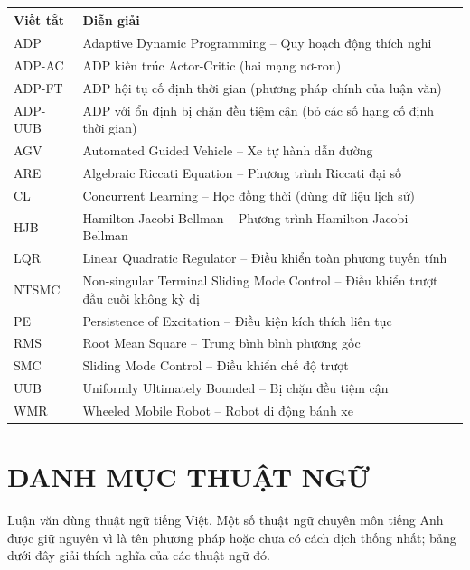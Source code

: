 \documentclass[12pt,a4paper]{article}
\begin{document}
\begin{table}[H]
\centering
\begin{tabular}{lp{10.5cm}}
\toprule
\textbf{Viết tắt} & \textbf{Diễn giải} \\
\midrule
ADP     & Adaptive Dynamic Programming -- Quy hoạch động thích nghi \\
ADP-AC  & ADP kiến trúc Actor-Critic (hai mạng nơ-ron) \\
ADP-FT  & ADP hội tụ cố định thời gian (phương pháp chính của luận văn) \\
ADP-UUB & ADP với ổn định bị chặn đều tiệm cận (bỏ các số hạng cố định thời gian) \\
AGV     & Automated Guided Vehicle -- Xe tự hành dẫn đường \\
ARE     & Algebraic Riccati Equation -- Phương trình Riccati đại số \\
CL      & Concurrent Learning -- Học đồng thời (dùng dữ liệu lịch sử) \\
HJB     & Hamilton-Jacobi-Bellman -- Phương trình Hamilton-Jacobi-Bellman \\
LQR     & Linear Quadratic Regulator -- Điều khiển toàn phương tuyến tính \\
NTSMC   & Non-singular Terminal Sliding Mode Control -- Điều khiển trượt đầu cuối không kỳ dị \\
PE      & Persistence of Excitation -- Điều kiện kích thích liên tục \\
RMS     & Root Mean Square -- Trung bình bình phương gốc \\
SMC     & Sliding Mode Control -- Điều khiển chế độ trượt \\
UUB     & Uniformly Ultimately Bounded -- Bị chặn đều tiệm cận \\
WMR     & Wheeled Mobile Robot -- Robot di động bánh xe \\
\bottomrule
\end{tabular}
\end{table}

\newpage
\section*{DANH MỤC THUẬT NGỮ}

Luận văn dùng thuật ngữ tiếng Việt. Một số thuật ngữ chuyên môn tiếng Anh được giữ nguyên vì là tên phương pháp hoặc chưa có cách dịch thống nhất; bảng dưới đây giải thích nghĩa của các thuật ngữ đó.
\end{document}
